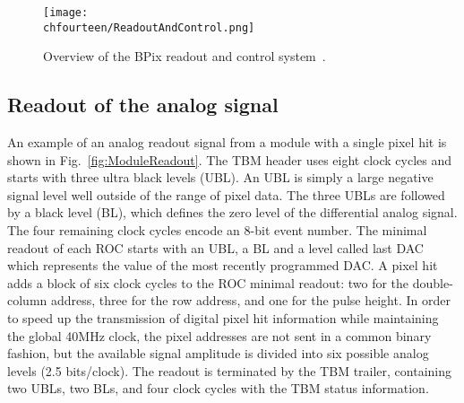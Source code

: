 \begin{figure}[!htb]
 \begin{center}
 \texttt{[image: \\chfourteen/ReadoutAndControl.png]}
 \end{center}
 \caption{Overview of the BPix readout and control system~\cite{Kotlinski200673}.}
 \label{fig:BPixSystem}
\end{figure}

\subsection{Readout of the analog signal}\label{subsec:BPixReadout}

An example of an analog readout signal from a module with a single pixel hit is shown in Fig.~\ref{fig:ModuleReadout}.
The TBM header uses eight clock cycles and starts with three ultra black levels (UBL). An UBL is simply a large negative signal level well outside of the range of pixel data.
The three UBLs are followed by a black level (BL), which defines the zero level of the differential analog signal.
The four remaining clock cycles encode an 8-bit event number.
The minimal readout of each ROC starts with an UBL, a BL and a level called last DAC which represents the value of the most recently programmed DAC.
A pixel hit adds a block of six clock cycles to the ROC minimal readout: two for the double-column address, three for the row address, and one for the pulse height.
In order to speed up the transmission of digital pixel hit information while maintaining the global 40\unit{MHz} clock,
the pixel addresses are not sent in a common binary fashion, but the available signal amplitude is divided into six possible analog levels (2.5 bits/clock).
The readout is terminated by the TBM trailer, containing two UBLs, two BLs, and four clock cycles with the TBM status information.

